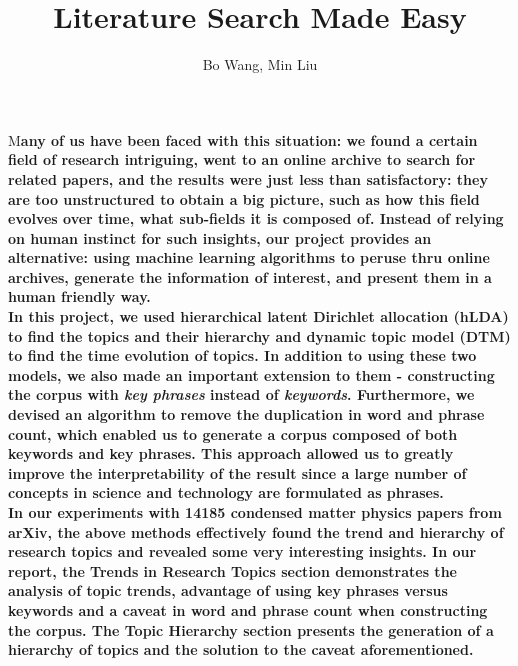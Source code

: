 \documentclass[DIV=calc, paper=letter, fontsize=10pt, twocolumn]{scrartcl}	 %
\title{\Huge Literature Search Made Easy} %
\author{Bo Wang, Min Liu } %
\date{} %
\newcommand{\initial}[1]{ %
\lettrine[lines=3,lhang=0.3,nindent=0em]{
\color{DarkGoldenrod}
{\textsf{#1}}}{}}
\begin{document}
\maketitle %

\thispagestyle{fancy} %


\initial{M}\textbf{any of us have been faced with this situation: we found a certain field of research intriguing, went to an online archive to search for related papers, and the results were just less than satisfactory: they are too unstructured to obtain a big picture, such as how this field evolves over time, what sub-fields it is composed of. Instead of relying on human instinct for such insights, our project provides an alternative: using machine learning algorithms to peruse thru online archives, generate the information of interest, and present them in a human friendly way.\\
In this project, we used hierarchical latent Dirichlet allocation (hLDA) to find the topics and their hierarchy and dynamic topic model (DTM) to find the time evolution of topics. In addition to using these two models, we also made an important extension to them - constructing the corpus with {\it key phrases} instead of {\it keywords}. Furthermore, we devised an algorithm to remove the duplication in word and phrase count, which enabled us to generate a corpus composed of both keywords and key phrases. This approach allowed us to greatly improve the interpretability of the result since a large number of concepts in science and technology are formulated as phrases.\\
In our experiments with 14185 condensed matter physics papers from arXiv, the above methods effectively found the trend and hierarchy of research topics and revealed some very interesting insights. In our report, the Trends in Research Topics section demonstrates the analysis of topic trends, advantage of using key phrases versus keywords and a caveat in word and phrase count when constructing the corpus. The Topic Hierarchy section presents the generation of a hierarchy of topics and the solution to the caveat aforementioned.}
\end{document}
